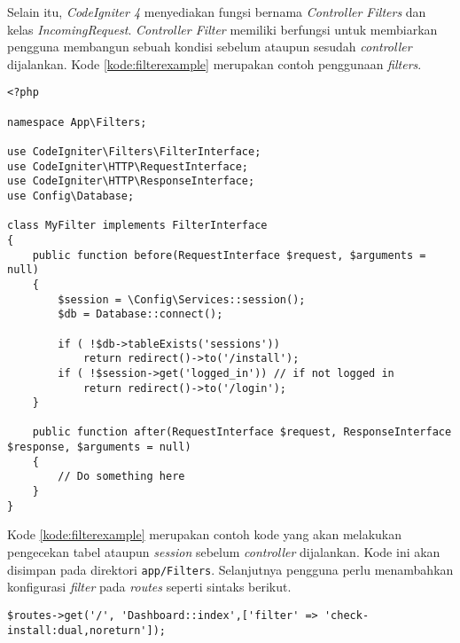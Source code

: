 Selain itu, \textit{CodeIgniter 4} menyediakan fungsi bernama \textit{Controller Filters} dan kelas \textit{IncomingRequest}. \textit{Controller Filter} memiliki berfungsi untuk membiarkan pengguna membangun sebuah kondisi sebelum ataupun sesudah \textit{controller} dijalankan. Kode \ref{kode:filterexample} merupakan contoh penggunaan \textit{filters}.

\begin{lstlisting}[caption=Contoh \textit{Controllers Filters} pada \textit{CodeIgniter 4},label=kode:filterexample]
<?php

namespace App\Filters;

use CodeIgniter\Filters\FilterInterface;
use CodeIgniter\HTTP\RequestInterface;
use CodeIgniter\HTTP\ResponseInterface;
use Config\Database;

class MyFilter implements FilterInterface
{
    public function before(RequestInterface $request, $arguments = null)
    {
        $session = \Config\Services::session();
        $db = Database::connect();

        if ( !$db->tableExists('sessions'))
			return redirect()->to('/install');
		if ( !$session->get('logged_in')) // if not logged in
			return redirect()->to('/login');
    }

    public function after(RequestInterface $request, ResponseInterface $response, $arguments = null)
    {
        // Do something here
    }
}
\end{lstlisting}

Kode \ref{kode:filterexample} merupakan contoh kode yang akan melakukan pengecekan tabel ataupun \textit{session} sebelum \textit{controller} dijalankan. Kode ini akan disimpan pada direktori \texttt{app/Filters}. Selanjutnya pengguna perlu menambahkan konfigurasi \textit{filter } pada \textit{routes} seperti sintaks berikut.
\begin{center}
	\verb|$routes->get('/', 'Dashboard::index',['filter' => 'check-install:dual,noreturn']);|
\end{center}

